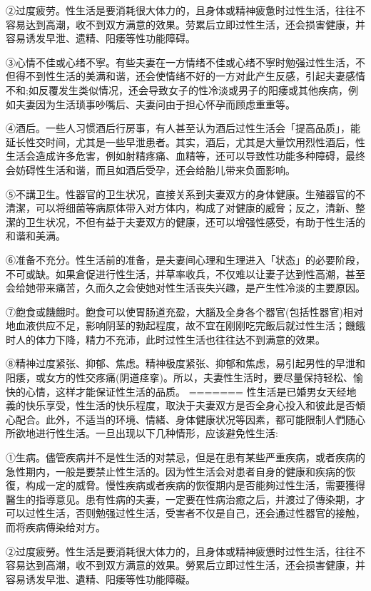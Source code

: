 \documentclass[12pt,UTF8]{ctexbook}
\begin{document}
②过度疲劳。性生活是要消耗很大体力的，且身体或精神疲惫时过性生活，往往不容易达到高潮，收不到双方满意的效果。劳累后立即过性生活，还会损害健康，并容易诱发早泄、遗精、阳痿等性功能障碍。

③心情不佳或心绪不寧。有些夫妻在一方情绪不佳或心绪不寧时勉强过性生活，不但得不到性生活的美满和谐，还会使情绪不好的一方对此产生反感，引起夫妻感情不和;如反覆发生类似情况，还会导致女子的性冷淡或男子的阳痿或其他疾病，例如夫妻因为生活琐事吵嘴后、夫妻问由于担心怀孕而顾虑重重等。

④酒后。一些人习惯酒后行房事，有人甚至认为酒后过性生活会「提高品质」，能延长性交时间，尤其是一些早泄患者。其实，酒后，尤其是大量饮用烈性酒后，性生活会造成许多危害，例如射精疼痛、血精等，还可以导致性功能多种障碍，最终会妨碍性生活和谐，而且如酒后受孕，还会给胎儿带来负面影响。

⑤不講卫生。性器官的卫生状况，直接关系到夫妻双方的身体健康。生殖器官的不清潔，可以将细菌等病原体带入对方体内，构成了对健康的威脅；反之，清新、整潔的卫生状况，不但有益于夫妻双方的健康，还可以增强性感受，有助于性生活的和谐和美满。

⑥准备不充分。性生活前的准备，是夫妻间心理和生理进入「状态」的必要阶段，不可或缺。如果倉促进行性生活，并草率收兵，不仅难以让妻子达到性高潮，甚至会给她带来痛苦，久而久之会使她对性生活丧失兴趣，是产生性冷淡的主要原因。

⑦飽食或饑餓时。飽食可以使胃肠道充盈，大腦及全身各个器官(包括性器官)相对地血液供应不足，影响阴茎的勃起程度，故不宜在刚刚吃完飯后就过性生活；饑餓时人的体力下降，精力不充沛，此时过性生活也往往达不到满意的效果。

⑧精神过度紧张、抑郁、焦虑。精神极度紧张、抑郁和焦虑，易引起男性的早泄和阳痿，或女方的性交疼痛(阴道痉挛)。所以，夫妻性生活时，要尽量保持轻松、愉快的心情，这样才能保证性生活的品质。
=======
性生活是已婚男女天经地義的快乐享受，性生活的快乐程度，取決于夫妻双方是否全身心投入和彼此是否傾心配合。此外，不适当的环境、情緒、身体健康状况等因素，都可能限制人們随心所欲地进行性生活。一旦出现以下几种情形，应该避免性生活:

①生病。儘管疾病并不是性生活的对禁忌，但是在患有某些严重疾病，或者疾病的急性期内，一般是要禁止性生活的。因为性生活会对患者自身的健康和疾病的恢復，构成一定的威脅。慢性疾病或者疾病的恢復期内是否能夠过性生活，需要獲得醫生的指導意见。患有性病的夫妻，一定要在性病治癒之后，并渡过了傳染期，才可以过性生活，否则勉强过性生活，受害者不仅是自己，还会通过性器官的接触，而将疾病傳染给对方。

②过度疲勞。性生活是要消耗很大体力的，且身体或精神疲憊时过性生活，往往不容易达到高潮，收不到双方满意的效果。勞累后立即过性生活，还会损害健康，并容易诱发早泄、遺精、阳痿等性功能障礙。
\end{document}
